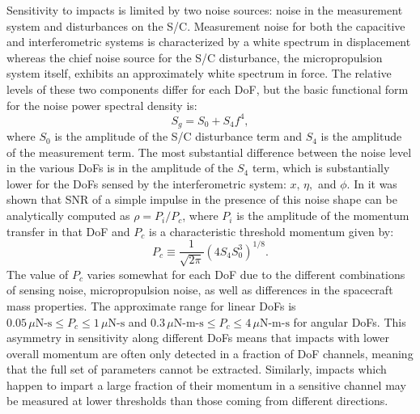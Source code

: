 \documentclass[twocolumn, trackchanges]{aastex62}
\begin{document}
Sensitivity to impacts is limited by two noise sources: noise in the measurement system and disturbances on the S/C.  Measurement noise for both the capacitive and interferometric systems is characterized by a white spectrum in displacement whereas the chief noise source for the S/C disturbance, the micropropulsion system itself, exhibits an approximately white spectrum in force.  The relative levels of these two components differ for each DoF, but the basic functional form for the noise power spectral density is:
\begin{equation}
S_{g}=S_0+S_4f^4,
\label{eq:noise}
\end{equation}
where $S_0$ is the amplitude of the S/C disturbance term and $S_4$ is the amplitude of the measurement term. The most substantial difference between the noise level in the various DoFs is in the amplitude of the $S_4$ term, which is substantially lower for the DoFs sensed by the interferometric system: $x,\,\eta,$ and $\phi$.  In \cite{Thorpe:2015cxa} it was shown that SNR of a simple impulse in the presence of this noise shape can be analytically computed as $\rho =  P_i/P_c$, where $P_i$ is the amplitude of the momentum transfer in that DoF and $P_c$ is a characteristic threshold momentum given by:
\begin{equation}
P_c \equiv \frac{1}{\sqrt{2\pi}}\left(4 S_4 S_0^3\right)^{1/8}.\label{eq:SNRp}
\end{equation} 
The value of $P_c$ varies somewhat for each DoF due to the different combinations of sensing noise, micropropulsion noise, as well as differences in the spacecraft mass properties. The approximate range for linear DoFs is $0.05\,\mu\textrm{N-s}\leq P_c \leq 1\,\mu\textrm{N-s}$ and $0.3\,\mu\textrm{N-m-s}\leq P_c \leq 4\,\mu\textrm{N-m-s}$ for angular DoFs. This asymmetry in sensitivity along different DoFs means that impacts with lower overall momentum are often only detected in a fraction of DoF channels, meaning that the full set of parameters cannot be extracted. Similarly, impacts which happen to impart a large fraction of their momentum in a sensitive channel may be measured at lower thresholds than those coming from different directions.

\end{document}
